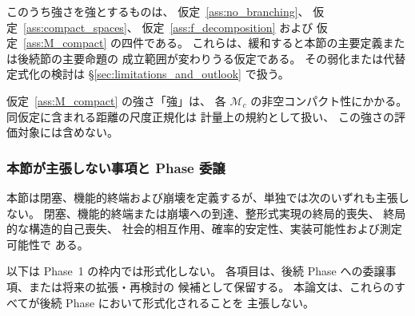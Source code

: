 \medskip
このうち強さを強とするものは、
仮定~\ref{ass:no_branching}、
仮定~\ref{ass:compact_spaces}、
仮定~\ref{ass:f_decomposition} および
仮定~\ref{ass:M_compact} の四件である。
これらは、緩和すると本節の主要定義または後続節の主要命題の
成立範囲が変わりうる仮定である。
その弱化または代替定式化の検討は
\S\ref{sec:limitations_and_outlook} で扱う。

仮定~\ref{ass:M_compact} の強さ「強」は、
各 $\mathcal{M}_c$ の非空コンパクト性にかかる。
同仮定に含まれる距離の尺度正規化は
計量上の規約として扱い、
この強さの評価対象には含めない。

\subsubsection*{本節が主張しない事項と Phase 委譲}

本節は閉塞、機能的終端および崩壊を定義するが、単独では次のいずれも主張しない。
閉塞、機能的終端または崩壊への到達、整形式実現の終局的喪失、
終局的な構造的自己喪失、
社会的相互作用、確率的安定性、実装可能性および測定可能性で
ある。

以下は Phase~1 の枠内では形式化しない。
各項目は、後続 Phase への委譲事項、または将来の拡張・再検討の
候補として保留する。
本論文は、これらのすべてが後続 Phase において形式化されることを
主張しない。


